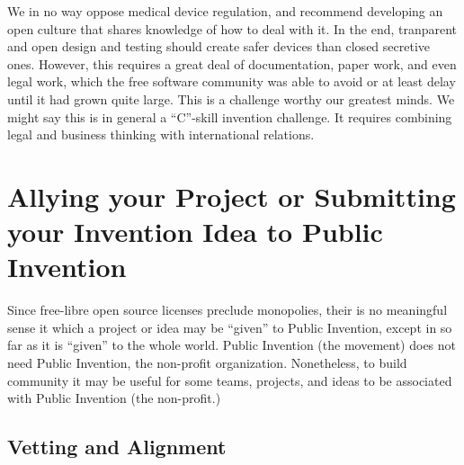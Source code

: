 \documentclass[
	fontsize=10pt, %
	twoside=false, %
	secnumdepth=1, %
]{kaobook}
\begin{document}
We in no way oppose medical device regulation, and recommend developing an open culture
that shares knowledge of how to deal with it. In the end, tranparent and open
design and testing should create safer devices than closed secretive ones. However,
this requires a great deal of documentation, paper work, and even legal work, which
the free software community was able to avoid or at least delay until it had grown
quite large.
This is a challenge worthy our greatest minds. We might say this is in general
a ``C''-skill invention challenge. It requires combining legal and
business thinking with international relations.

\chapter{Allying your Project or Submitting your Invention Idea to Public Invention}

Since free-libre open source licenses preclude monopolies, their is no
meaningful sense it which a project or idea may be ``given'' to Public Invention,
except in so far as it is ``given'' to the whole world.
Public Invention (the movement) does not need Public Invention, the non-profit organization.
Nonetheless, to build community it may be useful for some teams, projects, and ideas
to be associated with Public Invention (the non-profit.)

\section{Vetting and Alignment}
\end{document}
